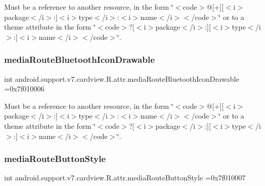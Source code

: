 Must be a reference to another resource, in the form \char`\"{}$<$code$>$@\mbox{[}+\mbox{]}\mbox{[}$<$i$>$package$<$/i$>$\+:\mbox{]}$<$i$>$type$<$/i$>$\+:$<$i$>$name$<$/i$>$$<$/code$>$\char`\"{} or to a theme attribute in the form \char`\"{}$<$code$>$?\mbox{[}$<$i$>$package$<$/i$>$\+:\mbox{]}\mbox{[}$<$i$>$type$<$/i$>$\+:\mbox{]}$<$i$>$name$<$/i$>$$<$/code$>$\char`\"{}. \mbox{\label{classandroid_1_1support_1_1v7_1_1cardview_1_1R_1_1attr_a4b01c22c10b3cdef8dc8bb4653115f7c}} 
\subsubsection{\texorpdfstring{media\+Route\+Bluetooth\+Icon\+Drawable}{mediaRouteBluetoothIconDrawable}}
{\footnotesize\ttfamily int android.\+support.\+v7.\+cardview.\+R.\+attr.\+media\+Route\+Bluetooth\+Icon\+Drawable =0x7f010006\hspace{0.3cm}{\ttfamily [static]}}

Must be a reference to another resource, in the form \char`\"{}$<$code$>$@\mbox{[}+\mbox{]}\mbox{[}$<$i$>$package$<$/i$>$\+:\mbox{]}$<$i$>$type$<$/i$>$\+:$<$i$>$name$<$/i$>$$<$/code$>$\char`\"{} or to a theme attribute in the form \char`\"{}$<$code$>$?\mbox{[}$<$i$>$package$<$/i$>$\+:\mbox{]}\mbox{[}$<$i$>$type$<$/i$>$\+:\mbox{]}$<$i$>$name$<$/i$>$$<$/code$>$\char`\"{}. \mbox{\label{classandroid_1_1support_1_1v7_1_1cardview_1_1R_1_1attr_a21413797e96a031cac7e0b62ec9fbcd7}} 
\subsubsection{\texorpdfstring{media\+Route\+Button\+Style}{mediaRouteButtonStyle}}
{\footnotesize\ttfamily int android.\+support.\+v7.\+cardview.\+R.\+attr.\+media\+Route\+Button\+Style =0x7f010007\hspace{0.3cm}{\ttfamily [static]}}

